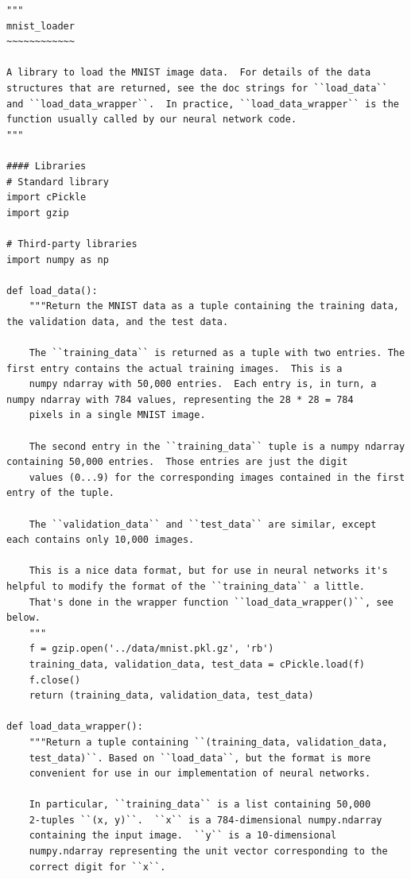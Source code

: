 \documentclass[a4paper,twoside,10pt]{book}
\begin{document}
\begin{lstlisting}
"""
mnist_loader
~~~~~~~~~~~~

A library to load the MNIST image data.  For details of the data
structures that are returned, see the doc strings for ``load_data``
and ``load_data_wrapper``.  In practice, ``load_data_wrapper`` is the
function usually called by our neural network code.
"""

#### Libraries
# Standard library
import cPickle
import gzip

# Third-party libraries
import numpy as np

def load_data():
	"""Return the MNIST data as a tuple containing the training data, the validation data, and the test data.
	
	The ``training_data`` is returned as a tuple with two entries. The first entry contains the actual training images.  This is a
	numpy ndarray with 50,000 entries.  Each entry is, in turn, a numpy ndarray with 784 values, representing the 28 * 28 = 784
	pixels in a single MNIST image. 
	
	The second entry in the ``training_data`` tuple is a numpy ndarray 	containing 50,000 entries.  Those entries are just the digit
	values (0...9) for the corresponding images contained in the first 	entry of the tuple.
	
	The ``validation_data`` and ``test_data`` are similar, except 	each contains only 10,000 images.
	
	This is a nice data format, but for use in neural networks it's helpful to modify the format of the ``training_data`` a little.
	That's done in the wrapper function ``load_data_wrapper()``, see below.
	"""
	f = gzip.open('../data/mnist.pkl.gz', 'rb')
	training_data, validation_data, test_data = cPickle.load(f)
	f.close()
	return (training_data, validation_data, test_data)

def load_data_wrapper():
	"""Return a tuple containing ``(training_data, validation_data,
	test_data)``. Based on ``load_data``, but the format is more
	convenient for use in our implementation of neural networks.
	
	In particular, ``training_data`` is a list containing 50,000
	2-tuples ``(x, y)``.  ``x`` is a 784-dimensional numpy.ndarray
	containing the input image.  ``y`` is a 10-dimensional
	numpy.ndarray representing the unit vector corresponding to the
	correct digit for ``x``.
	

\end{lstlisting}
\end{document}
